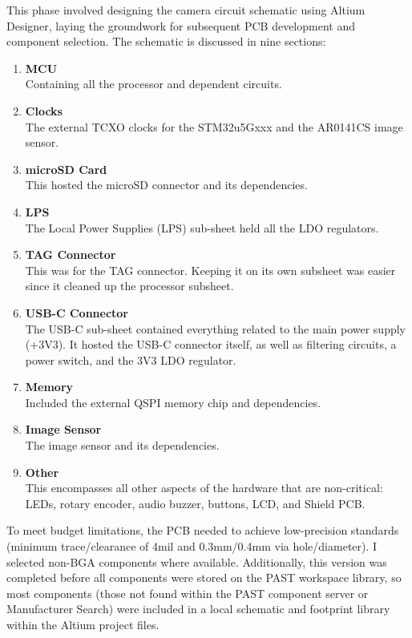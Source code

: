 This phase involved designing the camera circuit schematic using Altium Designer, laying the groundwork for subsequent PCB development and component selection. The schematic is discussed in nine sections:

\begin{enumerate}[noitemsep]
    \item \textbf{MCU} \\
    Containing all the processor and dependent circuits.
    \item \textbf{Clocks} \\
    The external TCXO clocks for the STM32u5Gxxx and the AR0141CS image sensor.
    \item \textbf{microSD Card} \\
    This hosted the microSD connector and its dependencies.
    \item \textbf{LPS} \\
    The Local Power Supplies (LPS) sub-sheet held all the LDO regulators.
    \item \textbf{TAG Connector} \\
    This was for the TAG connector. Keeping it on its own subsheet was easier since it cleaned up the processor subsheet.
    \item \textbf{USB-C Connector} \\
    The USB-C sub-sheet contained everything related to the main power supply (+3V3). It hosted the USB-C connector itself, as well as filtering circuits, a power switch, and the 3V3 LDO regulator.
    \item \textbf{Memory} \\
    Included the external QSPI memory chip and dependencies.
    \item \textbf{Image Sensor} \\
    The image sensor and its dependencies.
    \item \textbf{Other} \\
    This encompasses all other aspects of the hardware that are non-critical: LEDs, rotary encoder, audio buzzer, buttons, LCD, and Shield PCB.
\end{enumerate}

To meet budget limitations, the PCB needed to achieve low-precision standards (minimum trace/clearance of 4mil and 0.3mm/0.4mm via hole/diameter). I selected non-BGA components where available. Additionally, this version was completed before all components were stored on the PAST workspace library, so most components (those not found within the PAST component server or Manufacturer Search) were included in a local schematic and footprint library within the Altium project files.